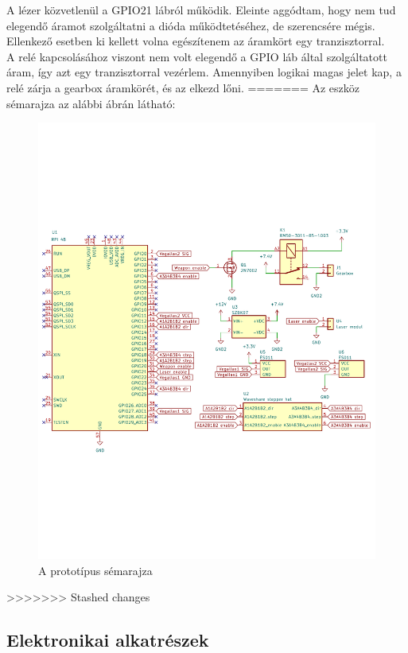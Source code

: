 \documentclass[12pt,a4paper]{article}
\begin{document}
A lézer közvetlenül a GPIO21 lábról működik. Eleinte aggódtam, hogy nem tud elegendő áramot szolgáltatni a dióda működtetéséhez, de szerencsére mégis. Ellenkező esetben ki kellett volna egészítenem az áramkört egy tranzisztorral. \\

A relé kapcsolásához viszont nem volt elegendő a GPIO láb által szolgáltatott áram, így azt egy tranzisztorral vezérlem. Amennyiben logikai magas jelet kap, a relé zárja a gearbox áramkörét, és az elkezd lőni.
=======
Az eszköz sémarajza az alábbi ábrán látható:

\begin{figure}[h!]
	\centering
	\includegraphics[width=1\linewidth]{schematic}
	\caption{A prototípus sémarajza}
	\label{fig:schematic}
\end{figure}
>>>>>>> Stashed changes

\subsection{Elektronikai alkatrészek}
\end{document}
